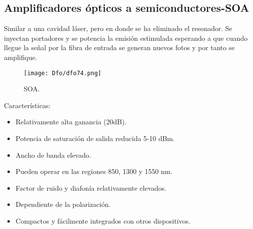 \documentclass[
	12pt, %
	fleqn, %
	a4paper, %
	oneside, %
]{LegrandOrangeBook}
\begin{document}
\subsection{Amplificadores ópticos a semiconductores-SOA}
Similar a una cavidad láser, pero en donde se ha eliminado el resonador. Se inyectan portadores y se potencia la emisión estimulada esperando a que cuando llegue la señal por la fibra de entrada se generan nuevos fotos y por tanto se amplifique.
\begin{figure}[H]
\centering
\texttt{[image: Dfo/dfo74.png]}
\caption{SOA.}
\end{figure}
Características:
\begin{itemize}
\item Relativamente alta ganancia (20dB).
\item Potencia de saturación de salida reducida 5-10 dBm.
\item Ancho de banda elevado.
\item Pueden operar en las regiones 850, 1300 y 1550 nm.
\item Factor de ruido y diafonía relativamente elevados.
\item Dependiente de la polarización.
\item Compactos y fácilmente integrados con otros dispositivos.
\end{itemize}
\end{document}
